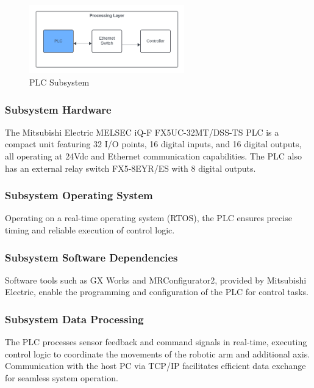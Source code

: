 \begin{figure}[h!]
	\centering
 	\includegraphics[width=0.6\textwidth]{images/PLC_Processing.png}
 \caption{ PLC Subsystem}
\end{figure}

\subsubsection{Subsystem Hardware}
The Mitsubishi Electric MELSEC iQ-F FX5UC-32MT/DSS-TS PLC is a compact unit featuring 32 I/O points, 16 digital inputs, and 16 digital outputs, all operating at 24Vdc and Ethernet communication capabilities. The PLC also has an external relay switch FX5-8EYR/ES with 8 digital outputs.


\subsubsection{Subsystem Operating System}
Operating on a real-time operating system (RTOS), the PLC ensures precise timing and reliable execution of control logic.

\subsubsection{Subsystem Software Dependencies}
Software tools such as GX Works and MRConfigurator2, provided by Mitsubishi Electric, enable the programming and configuration of the PLC for control tasks.

\subsubsection{Subsystem Data Processing}
The PLC processes sensor feedback and command signals in real-time, executing control logic to coordinate the movements of the robotic arm and additional axis. Communication with the host PC via TCP/IP facilitates efficient data exchange for seamless system operation.


